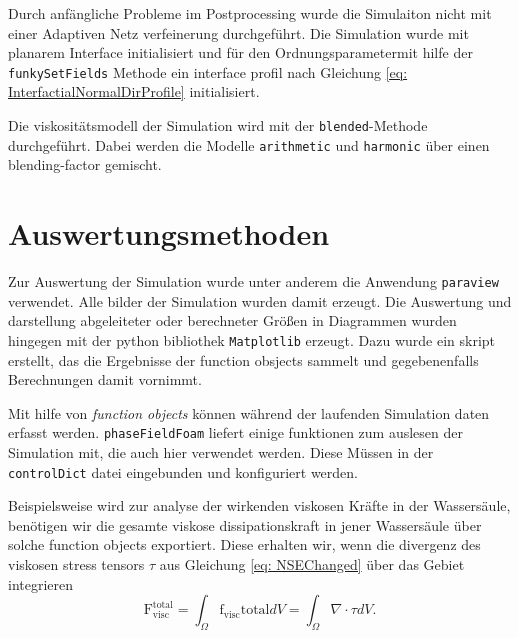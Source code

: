 Durch anfängliche Probleme im Postprocessing wurde die Simulaiton nicht mit einer Adaptiven Netz verfeinerung durchgeführt. 
Die Simulation wurde mit planarem Interface initialisiert und für den Ordnungsparametermit hilfe der \texttt{funkySetFields} Methode ein interface profil nach Gleichung \ref{eq: InterfactialNormalDirProfile} initialisiert. 

Die viskositätsmodell der Simulation wird mit der \texttt{blended}-Methode durchgeführt. Dabei werden die Modelle \texttt{arithmetic} und \texttt{harmonic} über einen blending-factor gemischt. 

\section{Auswertungsmethoden}
Zur Auswertung der Simulation wurde unter anderem die Anwendung \texttt{paraview} verwendet. Alle bilder der Simulation wurden damit erzeugt. Die Auswertung und darstellung abgeleiteter oder berechneter Größen in Diagrammen wurden hingegen mit der python bibliothek \texttt{Matplotlib} erzeugt. Dazu wurde ein skript erstellt, das die Ergebnisse der function obsjects sammelt und gegebenenfalls Berechnungen damit vornimmt. 

Mit hilfe von \textit{function objects} können während der laufenden Simulation daten erfasst werden. \texttt{phaseFieldFoam} liefert einige funktionen zum auslesen der Simulation mit, die auch hier verwendet werden. Diese Müssen in der \texttt{controlDict} datei eingebunden und konfiguriert werden. 

Beispielsweise wird zur analyse der wirkenden viskosen Kräfte in der Wassersäule, benötigen wir die gesamte viskose dissipationskraft in jener Wassersäule über solche function objects exportiert. Diese erhalten wir, wenn die divergenz des viskosen stress tensors $\tau$ aus Gleichung \ref{eq: NSEChanged} über das Gebiet integrieren
\begin{equation}
    \mathrm{F}_{\mathrm{visc}}^{\mathrm{total}} = \int_{\Omega} \mathrm{f}_{\mathrm{visc}}{\mathrm{total}} dV = \int_{\Omega} \nabla \cdot \tau dV.
\end{equation}